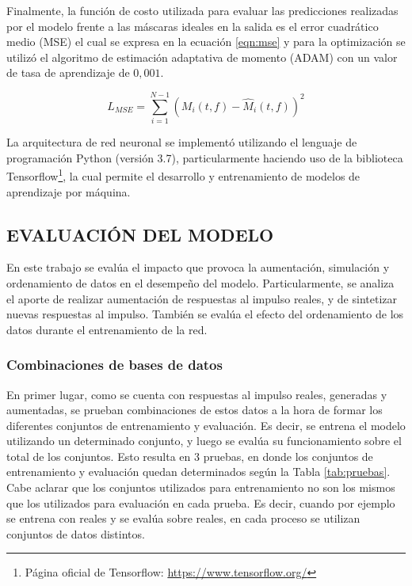 Finalmente, la función de costo utilizada para evaluar las predicciones realizadas por el modelo frente a las máscaras ideales en la salida es el error cuadrático medio (MSE) el cual se expresa en la ecuación \ref{eqn:mse} y para la optimización se utilizó el algoritmo de estimación adaptativa de momento (ADAM) \cite{adam} con un valor de tasa de aprendizaje de $0,001$. 

\begin{equation}
\label{eqn:mse}
	L_{MSE} = \sum_{i=1}^{N-1}(M_{i}(t,f) - \hat{M}_{i}(t,f))^{2}
\end{equation}

La arquitectura de red neuronal se implementó utilizando el lenguaje de programación Python (versión 3.7), particularmente haciendo uso de la biblioteca Tensorflow\footnote{Página oficial de Tensorflow: \url{https://www.tensorflow.org/}}, la cual permite el desarrollo y entrenamiento de modelos de aprendizaje por máquina.  


\subsection[Evaluación del modelo]{EVALUACIÓN DEL MODELO}
En este trabajo se evalúa el impacto que provoca la aumentación, simulación y ordenamiento de datos en el desempeño del modelo.
Particularmente, se analiza el aporte de realizar aumentación de respuestas al impulso reales, y de sintetizar nuevas respuestas al impulso. También se evalúa el efecto del ordenamiento de los datos durante el entrenamiento de la red.

\subsubsection{Combinaciones de bases de datos}
En primer lugar, como se cuenta con respuestas al impulso reales, generadas  y aumentadas, se prueban combinaciones de estos datos a la hora de formar los diferentes conjuntos de entrenamiento y evaluación. Es decir, se entrena el modelo utilizando un determinado conjunto, y luego se evalúa su funcionamiento sobre el total de los conjuntos. Esto resulta en 3 pruebas, en donde los conjuntos de entrenamiento y evaluación quedan determinados según la Tabla \ref{tab:pruebas}. Cabe aclarar que los conjuntos utilizados para entrenamiento no son los mismos que los utilizados para evaluación en cada prueba. Es decir, cuando por ejemplo se entrena con reales y se evalúa sobre reales, en cada proceso se utilizan conjuntos de datos distintos.


